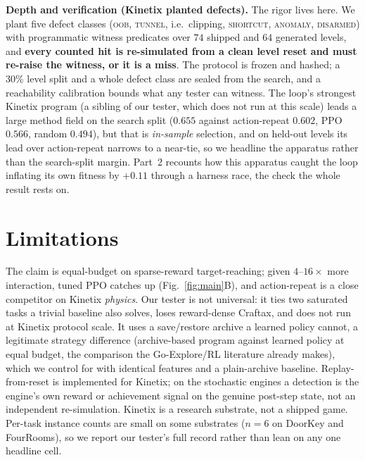 \textbf{Depth and verification (Kinetix planted defects).} The rigor lives here. We plant five defect classes
(\textsc{oob}, \textsc{tunnel}, i.e.\ clipping, \textsc{shortcut}, \textsc{anomaly}, \textsc{disarmed}) with programmatic
witness predicates over $74$ shipped and $64$ generated levels, and \textbf{every counted hit is re-simulated from a clean
level reset and must re-raise the witness, or it is a miss}. The protocol is frozen and hashed; a $30\%$ level split and a
whole defect class are sealed from the search, and a reachability calibration bounds what any tester can witness. The
loop's strongest Kinetix program (a sibling of our tester, which does not run at this scale) leads a large method field on
the search split ($0.655$ against action-repeat $0.602$, PPO $0.566$, random $0.494$), but that is \emph{in-sample}
selection, and on held-out levels its lead over action-repeat narrows to a near-tie, so we headline the apparatus rather
than the search-split margin. Part~2 recounts how this apparatus caught the loop inflating its own fitness by $+0.11$
through a harness race, the check the whole result rests on.

\section{Limitations}
\label{sec:limits}
The claim is equal-budget on sparse-reward target-reaching; given $4$--$16\times$ more interaction, tuned PPO catches up
(Fig.~\ref{fig:main}B), and action-repeat is a close competitor on Kinetix \emph{physics}. Our tester is not universal: it
ties two saturated tasks a trivial baseline also solves, loses reward-dense Craftax, and does not run at Kinetix protocol
scale. It uses a save/restore archive a learned policy cannot, a legitimate strategy difference (archive-based program
against learned policy at equal budget, the comparison the Go-Explore/RL literature already makes), which we control for
with identical features and a plain-archive baseline. Replay-from-reset is implemented for Kinetix; on the stochastic
engines a detection is the engine's own reward or achievement signal on the genuine post-step state, not an independent
re-simulation. Kinetix is a research substrate, not a shipped game. Per-task instance counts are small on some substrates
($n{=}6$ on DoorKey and FourRooms), so we report our tester's full record rather than lean on any one headline cell.
